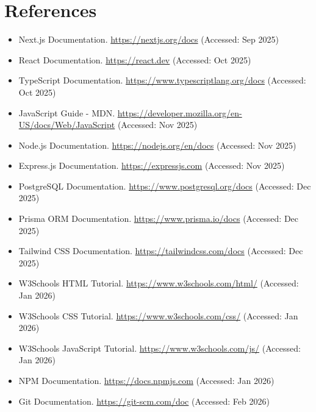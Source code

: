 \section*{References}

\begin{itemize}

\item Next.js Documentation. \url{https://nextjs.org/docs} (Accessed: Sep 2025)

\item React Documentation. \url{https://react.dev} (Accessed: Oct 2025)

\item TypeScript Documentation. \url{https://www.typescriptlang.org/docs} (Accessed: Oct 2025)

\item JavaScript Guide - MDN. \url{https://developer.mozilla.org/en-US/docs/Web/JavaScript} (Accessed: Nov 2025)

\item Node.js Documentation. \url{https://nodejs.org/en/docs} (Accessed: Nov 2025)

\item Express.js Documentation. \url{https://expressjs.com} (Accessed: Nov 2025)

\item PostgreSQL Documentation. \url{https://www.postgresql.org/docs} (Accessed: Dec 2025)

\item Prisma ORM Documentation. \url{https://www.prisma.io/docs} (Accessed: Dec 2025)

\item Tailwind CSS Documentation. \url{https://tailwindcss.com/docs} (Accessed: Dec 2025)

\item W3Schools HTML Tutorial. \url{https://www.w3schools.com/html/} (Accessed: Jan 2026)

\item W3Schools CSS Tutorial. \url{https://www.w3schools.com/css/} (Accessed: Jan 2026)

\item W3Schools JavaScript Tutorial. \url{https://www.w3schools.com/js/} (Accessed: Jan 2026)

\item NPM Documentation. \url{https://docs.npmjs.com} (Accessed: Jan 2026)

\item Git Documentation. \url{https://git-scm.com/doc} (Accessed: Feb 2026)


\end{itemize}
